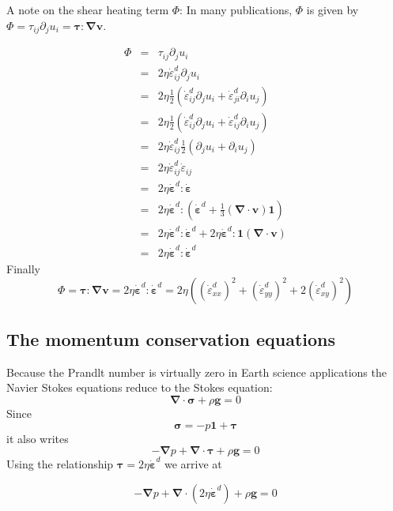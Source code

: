 A note on the shear heating term $\Phi$: In many publications, $\Phi$ 
is given by $\Phi=\tau_{ij}\partial_j u_i={\bm \tau}:{\bm \nabla}{\bm v}$.

\begin{eqnarray}
\Phi 
&=& \tau_{ij}\partial_j u_i \nonumber\\
&=& 2 \eta \dot{\varepsilon}_{ij}^d\partial_j u_i \nonumber\\
&=& 2 \eta \frac{1}{2}\left( \dot{\varepsilon}_{ij}^d\partial_j u_i + \dot{\varepsilon}_{ji}^d\partial_i u_j \right) \nonumber\\
&=& 2 \eta \frac{1}{2}\left( \dot{\varepsilon}_{ij}^d\partial_j u_i + \dot{\varepsilon}_{ij}^d\partial_i u_j \right) \nonumber\\
&=& 2 \eta  \dot{\varepsilon}_{ij}^d  \frac{1}{2}\left(\partial_j u_i + \partial_i u_j \right) \nonumber\\
&=& 2 \eta  \dot{\varepsilon}_{ij}^d   \dot{\varepsilon}_{ij} \nonumber\\
&=& 2 \eta  \dot{\bm \varepsilon}^d :  \dot{\bm \varepsilon} \nonumber\\
&=& 2 \eta  \dot{\bm \varepsilon}^d : \left( \dot{\bm \varepsilon}^d +\frac{1}{3} ({\bm \nabla}\cdot{\bm v}) {\bm 1} \right)\nonumber\\
&=& 2 \eta  \dot{\bm \varepsilon}^d : \dot{\bm \varepsilon}^d 
+ 2 \eta  \dot{\bm \varepsilon}^d : {\bm 1} ({\bm \nabla}\cdot{\bm v}) \nonumber\\ 
&=& 2 \eta  \dot{\bm \varepsilon}^d : \dot{\bm \varepsilon}^d 
\end{eqnarray}
Finally
\[
\Phi = {\bm \tau}:{\bm \nabla}{\bm v} = 2 \eta  \dot{\bm \varepsilon}^d : \dot{\bm \varepsilon}^d
= 2 \eta \left( (\dot{\varepsilon}_{xx}^d)^2 + (\dot{\varepsilon}_{yy}^d)^2 + 2(\dot{\varepsilon}_{xy}^d)^2 \right)
\]

\subsection{The momentum conservation equations} 

Because the Prandlt number is virtually zero in Earth science applications the Navier Stokes 
equations reduce to the Stokes equation:
\[
{\bm \nabla}\cdot {\bm \sigma} + \rho {\bm g} = 0
\]
Since 
\[
{\bm \sigma} = -p {\bm 1} + {\bm \tau}
\]
it also writes
\[
-{\bm \nabla}p + {\bm \nabla}\cdot {\bm \tau} + \rho {\bm g} = 0
\]
Using the relationship ${\bm \tau} = 2 \eta \dot{\bm \varepsilon}^d$ we arrive at 
\begin{mdframed}[backgroundcolor=blue!5]
\[
-{\bm \nabla}p + {\bm \nabla}\cdot (2 \eta \dot{\bm \varepsilon}^d ) + \rho {\bm g} = 0
\]
\end{mdframed}

